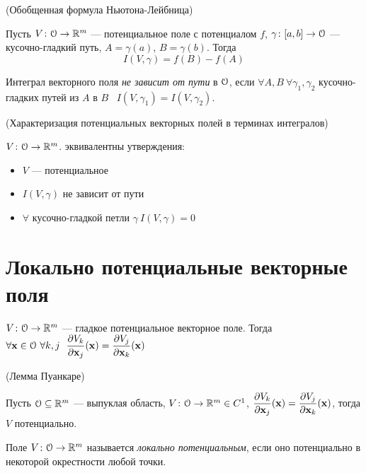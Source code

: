 \begin{theorem}(Обобщенная формула Ньютона-Лейбница)

    Пусть $V \colon \mathcal{O} \to \mathbb{R}^m$ --- потенциальное поле с потенциалом $f$,
    $\gamma \colon [a, b] \to \mathcal{O}$ --- кусочно-гладкий путь, $A = \gamma(a)$,
    $B = \gamma(b)$. Тогда
\[
    I(V, \gamma) = f(B) - f(A)
\]
\end{theorem}

\begin{definition}
    Интеграл векторного поля \textit{не зависит от пути} в $\mathcal{O}$, если $\forall A, B~
    \forall \gamma_1, \gamma_2$ кусочно-гладких путей из $A$ в $B$~ $I(V, \gamma_1)
    = I(V, \gamma_2)$.
\end{definition}

\begin{theorem}(Характеризация потенциальных векторных полей в терминах интегралов)

    $V \colon \mathcal{O} \to \mathbb{R}^m$. эквивалентны утверждения:
    \begin{itemize}
        \item $V$ --- потенциальное
        \item $I(V, \gamma)$ не зависит от пути
        \item $\forall$ кусочно-гладкой петли $\gamma~ I(V, \gamma) = 0$
    \end{itemize}
\end{theorem}

\section{Локально потенциальные векторные поля}

\begin{lemma}
    $V \colon \mathcal{O} \to \mathbb{R}^m$ --- гладкое потенциальное векторное поле. Тогда\\
    $\forall \mathbf{x} \in \mathcal{O}~ \forall k, j~~
    \dfrac{\partial V_k}{\partial \mathbf{x}_j}(\mathbf{x}) = \dfrac{\partial V_j}{\partial \mathbf{x}_k}(\mathbf{x})$
\end{lemma}

\begin{theorem}(Лемма Пуанкаре)

    Пусть $\mathcal{O} \subseteq \mathbb{R}^m$ --- выпуклая область, $V \colon \mathcal{O} \to \mathbb{R}^m \in C^1$,
    $\dfrac{\partial V_k}{\partial \mathbf{x}_j}(\mathbf{x}) = \dfrac{\partial V_j}{\partial \mathbf{x}_k}(\mathbf{x})$, тогда $V$ потенциально.
\end{theorem}

\begin{definition}
    Поле $V \colon \mathcal{O} \to \mathbb{R}^m$ называется \textit{локально потенциальным}, если
    оно потенциально в некоторой окрестности любой точки.
\end{definition}


